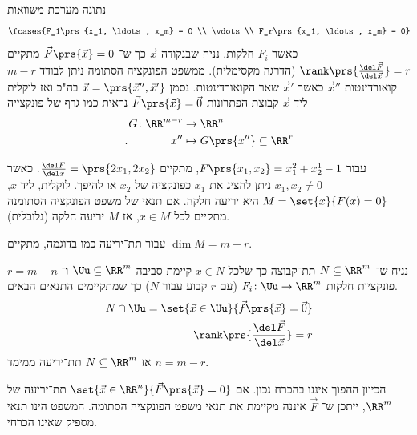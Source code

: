 \documentclass[a4paper,10pt,twoside,openany]{book}
\begin{document}
\begin{example}
נתונה מערכת משוואות
\[\fcases{F_1\prs{x_1, \ldots, x_m} = 0 \\
\vdots \\
F_r\prs{x_1, \ldots, x_m} = 0}\]
כאשר
$F_i$
חלקות. נניח שבנקודה
$\vec{x}$
כך ש־%
$\vec{F}\prs{\vec{x}} = 0$
מתקיים
$\rank\prs{\frac{\del \vec{F}}{\del \vec{x}}} = r$
(הדרגה מקסימלית).
ממשפט הפונקציה הסתומה ניתן לבודד
$m-r$
קואורדינטות
$\vec{x}''$
כאשר
$\vec{x}'$
שאר הקואורדינטות.
נסמן
$\vec{x} = \prs{\vec{x}'',\vec{x}'}$
בה"כ ואז לוקלית ליד
$\vec{x}$
קבוצת הפתרונות
$\vec{F}\prs{\vec{x}} = \vec{0}$
נראית כמו גרף של פונקצייה
\begin{align*}
G \colon \RR^{m-r} &\to \RR^n \\
\text{.} \phantom{G \colon \RR^{m}} x'' &\mapsto G\prs{x''} \subseteq \RR^r
\end{align*}
\end{example}
\begin{example}
עבור
$F\prs{x_1, x_2} = x_1^2 + x_2^1 - 1$,
מתקיים
$\frac{\del F}{\del x} = \prs{2x_1, 2x_2}$.
כאשר
$x_1, x_2 \neq 0$
ניתן להציג את
$x_1$
כפונקציה של
$x_2$
או להיפך.
לוקלית, ליד
$x$,
$M = \set{x}{F(x) = 0}$
היא יריעה חלקה.
אם תנאי של משפט הפונקציה הסתומנה מתקיים לכל
$x \in M$,
אז
$M$
יריעה חלקה (גלובלית).
\end{example}
\begin{exercise}
עבור תת־יריעה כמו בדוגמה, מתקיים
$\dim M = m-r$.
\end{exercise}
\begin{theorem}
נניח ש־%
$N \subseteq \RR^m$
תת־קבוצה כך שלכל
$x \in N$
קיימת סביבה
$\Uu \subseteq \RR^m$
ו־%
$r = m-n$
פונקציות חלקות
$F_i \colon \Uu \to \RR^m$
(עם
$r$
קבוע עבור
$N$)
כך שמתקיימים התנאים הבאים.
\begin{align*}
N \cap \Uu = \set{\vec{x} \in \Uu}{\vec{f}\prs{\vec{x}} = \vec{0}} \\
\rank\prs{\frac{\del \vec{F}}{\del\vec{x}}} = r
\end{align*}
אז
$N \subseteq \RR^m$
תת־יריעה ממימד
$n = m-r$.
\end{theorem}
\begin{remark}
הכיוון ההפוך איננו בהכרח נכון.
אם
$\set{\vec{x} \in \RR^n}{\vec{F}\prs{\vec{x}} = 0}$
תת־יריעה של
$\RR^m$,
ייתכן ש־%
$\vec{F}$
איננה מקיימת את תנאי משפט הפונקציה הסתומה.
המשפט הינו תנאי מספיק שאינו הכרחי.
\end{remark}
\end{document}

